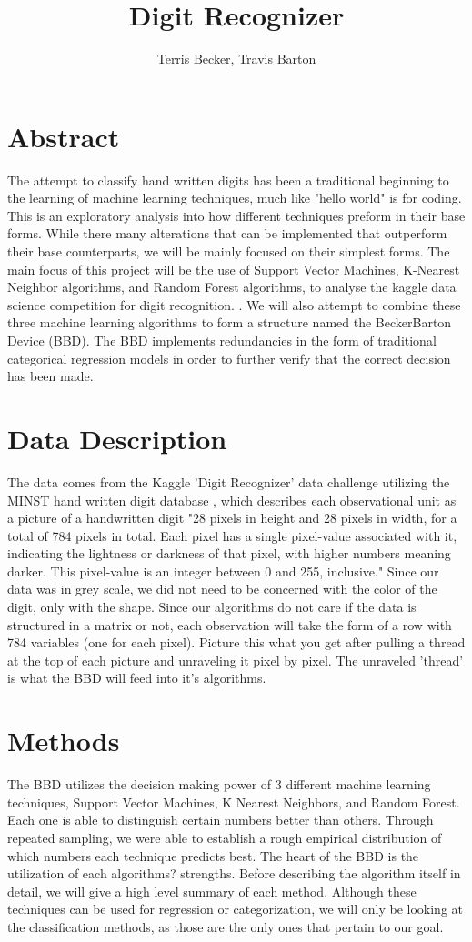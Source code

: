 \documentclass[11pt, oneside]{article}   	%
\title{Digit Recognizer}
\author{Terris Becker, Travis Barton}
\begin{document}
\maketitle
\section{Abstract}
The attempt to classify hand written digits has been a traditional beginning to the learning of machine learning techniques, much like "hello world" is for coding. This is an exploratory analysis into how different techniques preform in their base forms. While there many alterations that can be implemented that outperform their base counterparts, we will be mainly focused on their simplest forms. The main focus of this project will be the use of Support Vector Machines, K-Nearest Neighbor algorithms, and Random Forest algorithms, to analyse the kaggle data science competition for digit recognition. \cite{kagglechallange}. We will also attempt to combine these three machine learning algorithms to form a structure named the BeckerBarton Device (BBD). The BBD implements redundancies in the form of traditional categorical regression models in order to further verify that the correct decision has been made.

\section{Data Description}
The data comes from the Kaggle 'Digit Recognizer' data challenge utilizing the MINST hand written digit database \cite{kaggledata}, which describes each observational unit as a picture of a handwritten digit "28 pixels in height and 28 pixels in width, for a total of 784 pixels in total. Each pixel has a single pixel-value associated with it, indicating the lightness or darkness of that pixel, with higher numbers meaning darker. This pixel-value is an integer between 0 and 255, inclusive." Since our data was in grey scale, we did not need to be concerned with the color of the digit, only with the shape.
Since our algorithms do not care if the data is structured in a matrix or not, each observation will take the form of a row with 784 variables (one for each pixel). Picture this what you get after pulling a thread at the top of each picture and unraveling it pixel by pixel. The unraveled 'thread' is what the BBD will feed into it's algorithms.

\section{Methods}
The BBD utilizes the decision making power of 3 different machine learning techniques, Support Vector Machines, K Nearest Neighbors, and Random Forest. Each one is able to distinguish certain numbers better than others. Through repeated sampling, we were able to establish a rough empirical distribution of which numbers each technique predicts best. The heart of the BBD is the utilization of each algorithms? strengths. Before describing the algorithm itself in detail, we will give a high level summary of each method. Although these techniques can be used for regression or categorization, we will only be looking at the classification methods, as those are the only ones that pertain to our goal.
\end{document}
